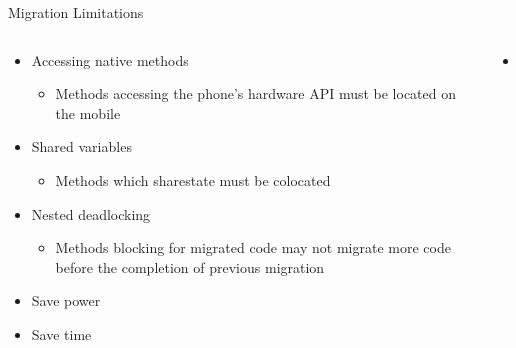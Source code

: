 \documentclass{beamer}
\begin{document}
\begin{frame}{Migration Limitations}
\begin{columns}
\begin{column}{5cm}
\begin{itemize}
	\item Accessing native methods
	\begin{itemize}
		\item Methods accessing the phone's hardware API must be located on the mobile
	\end{itemize}
	\item Shared variables
	\begin{itemize}
		\item Methods which sharestate must be colocated
	\end{itemize}
	\item Nested deadlocking
	\begin{itemize}
		\item Methods blocking for migrated code may not migrate more code before the completion of previous migration
	\end{itemize}
	\item Save power
	\item Save time
\end{itemize}
\end{column}
\begin{column}{5cm}
\begin{itemize}
	\begin{itemize}
		\item {}
	\end{itemize}
\end{itemize}
\end{column}
\end{columns}
\end{frame}
\end{document}

